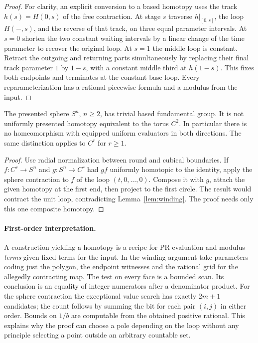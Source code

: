 \begin{proof}
For clarity, an explicit conversion to a based homotopy uses the track $h(s)=H(0,s)$ of the free contraction. At stage $s$ traverse $h|_{[0,s]}$, the loop $H(-,s)$, and the reverse of that track, on three equal parameter intervals. At $s=0$ shorten the two constant waiting intervals by a linear change of the time parameter to recover the original loop. At $s=1$ the middle loop is constant. Retract the outgoing and returning parts simultaneously by replacing their final track parameter $1$ by $1-s$, with a constant middle third at $h(1-s)$. This fixes both endpoints and terminates at the constant base loop. Every reparameterization has a rational piecewise formula and a modulus from the input.
\end{proof}

\begin{corollary}\label{cor:sphereTorus}\label{idx-surfaces39}
The presented sphere $S^n$, $n\ge2$, has trivial based fundamental group. It is not uniformly presented homotopy equivalent to the torus $C^2$. In particular there is no homeomorphism with equipped uniform evaluators in both directions. The same distinction applies to $C^r$ for $r\ge1$.
\end{corollary}
\begin{proof}
Use radial normalization between round and cubical boundaries. If $f:C^r\to S^n$ and $g:S^n\to C^r$ had $gf$ uniformly homotopic to the identity, apply the sphere contraction to $f$ of the loop $(t,0,\dots,0)$. Compose it with $g$, attach the given homotopy at the first end, then project to the first circle. The result would contract the unit loop, contradicting Lemma~\ref{lem:winding}. The proof needs only this one composite homotopy.
\end{proof}

\paragraph{First-order interpretation.}
A construction yielding a homotopy is a recipe for PR evaluation and modulus \emph{terms} given fixed terms for the input. In the winding argument take parameters coding just the polygon, the endpoint witnesses and the rational grid for the allegedly contracting map. The test on every face is a bounded scan. Its conclusion is an equality of integer numerators after a denominator product. For the sphere contraction the exceptional value search has exactly $2m+1$ candidates; the count follows by summing the bit for each pair $(i,j)$ in either order. Bounds on $1/b$ are computable from the obtained positive rational. This explains why the proof can choose a pole depending on the loop without any principle selecting a point outside an arbitrary countable set.
